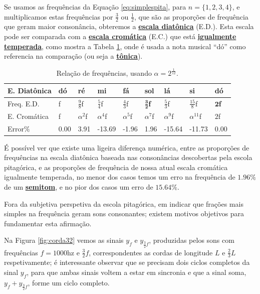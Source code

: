 Se usamos as frequências da Equação \ref{eq:simplespita}, para $n=\{1,2,3,4\}$,
e multiplicamos estas frequências por $\frac{3}{2}$ ou $\frac{1}{2}$, que
são as proporções de frequência que geram maior consonância,
obteremos a \hyperref[sec:pos:Diatonica]{\textbf{escala diatônica}} (E.D.).
Esta escala pode ser comparada com a \hyperref[sec:pos:Cromatica]{\textbf{escala cromática}} (E.C.)
que está \hyperref[subsec:tempigual]{\textbf{igualmente temperada}}, 
como mostra a Tabela \ref{tab:pitagorascromatica}, onde é usada a nota musical ``dó'' 
como referencia na comparação (ou seja a \hyperref[sec:Tonica]{\textbf{tônica}}).
\begin{table}[h]
  \centering
  \begin{tabular}{|l|l|l|l|l|l|l|l|l|}
  \hline
  E. Diatônica  & dó & ré & mi & fá & sol & lá & si & dó \\ \hline
  \hline
  Freq. E.D.  & f  & $\frac{9}{8}$f & $\frac{5}{4}$f & $\frac{4}{3}$f & $\mathbf{\frac{3}{2}}$\textbf{f} & $\frac{5}{3}$f & $\frac{15}{8}$f & $\mathbf{2}$\textbf{f}\\ \hline
  E. Cromática & f  & $\alpha^{2}$f  & $\alpha^{4}$f  & $\alpha^{5}$f  & $\alpha^{7}$f  & $\alpha^{9}$f  & $\alpha^{11}$f  & $2$f\\ \hline \hline
  Error$\%$ &  0.00 & 3.91 &-13.69 &-1.96 & 1.96 &-15.64&-11.73& 0.00 \\ \hline
  \end{tabular}
  \caption{Relação de frequências, usando $\alpha=2^\frac{1}{12}$.}
  \label{tab:pitagorascromatica}
\end{table}

É possível ver que existe uma ligeira diferença numérica, 
entre as proporções de frequências na escala diatônica baseada nas consonâncias descobertas pela escola pitagórica,
e as proporções de frequência de nossa atual escala cromática igualmente temperada,
no menor dos casos temos um  erro na frequência de $1.96\%$ de um \hyperref[sec:pos:Semitom]{\textbf{semitom}}, 
e no pior dos casos um erro de $15.64\%$.

Fora da subjetiva perspetiva da escola pitagórica, 
em indicar que frações mais simples na frequência geram sons consonantes; 
existem motivos objetivos para fundamentar esta afirmação.

Na Figura \ref{fig:corda32} vemos as sinais $y_{f}$ e $y_{\frac{3}{2}f}$, 
produzidas pelos sons com frequências $f=1000$hz e $\frac{3}{2}f$,
correspondentes as cordas de longitude $L$ e $\frac{2}{3}L$ respetivamente;
é interessante observar que se precisam dois ciclos completos da sinal $y_{f}$,
para que ambas sinais voltem a estar em sincronia e que a sinal soma, $y_{f}+y_{\frac{3}{2}f}$, forme um ciclo completo.


